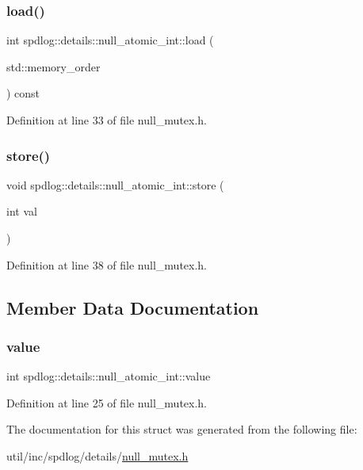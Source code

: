 \subsubsection{\texorpdfstring{load()}{load()}}
{\footnotesize\ttfamily int spdlog\+::details\+::null\+\_\+atomic\+\_\+int\+::load (\begin{DoxyParamCaption}\item[{std\+::memory\+\_\+order}]{ }\end{DoxyParamCaption}) const\hspace{0.3cm}{\ttfamily [inline]}}



Definition at line 33 of file null\+\_\+mutex.\+h.

\mbox{\label{structspdlog_1_1details_1_1null__atomic__int_a75c74956220ca5cc82a4eedcd9aa854f}} 
\subsubsection{\texorpdfstring{store()}{store()}}
{\footnotesize\ttfamily void spdlog\+::details\+::null\+\_\+atomic\+\_\+int\+::store (\begin{DoxyParamCaption}\item[{int}]{val }\end{DoxyParamCaption})\hspace{0.3cm}{\ttfamily [inline]}}



Definition at line 38 of file null\+\_\+mutex.\+h.



\subsection{Member Data Documentation}
\mbox{\label{structspdlog_1_1details_1_1null__atomic__int_ab433069a53cdd1402dc7b0b942d7095f}} 
\subsubsection{\texorpdfstring{value}{value}}
{\footnotesize\ttfamily int spdlog\+::details\+::null\+\_\+atomic\+\_\+int\+::value}



Definition at line 25 of file null\+\_\+mutex.\+h.



The documentation for this struct was generated from the following file\+:\begin{DoxyCompactItemize}
\item 
util/inc/spdlog/details/\hyperlink{null__mutex_8h}{null\+\_\+mutex.\+h}\end{DoxyCompactItemize}
